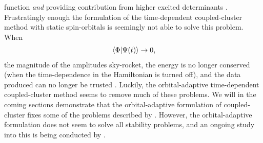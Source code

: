         function \emph{and} providing contribution from higher excited
        determinants \cite{pedersen2018symplectic}.
        Frustratingly enough the formulation of the time-dependent
        coupled-cluster method with static spin-orbitals is seemingly not
        able to solve this problem.
        When
        \begin{align}
            \braket*{\Phi}{\Psi(t)} \to 0,
        \end{align}
        the magnitude of the amplitudes sky-rocket, the energy is no longer
        conserved (when the time-dependence in the Hamiltonian is turned
        off), and the data produced can no longer be trusted
        \cite{pedersen2018symplectic}.
        Luckily, the orbital-adaptive time-dependent coupled-cluster method
        seems to remove much of these problems.
        We will in the coming sections demonstrate that the orbital-adaptive
        formulation of coupled-cluster fixes some of the problems described
        by \citeauthor{pedersen2018symplectic}
        \cite{pedersen2018symplectic}.
        However, the orbital-adaptive formulation does not seem to solve all
        stability problems, and an ongoing study into this is being
        conducted by \citeauthor{oa-stability} \cite{oa-stability}.

